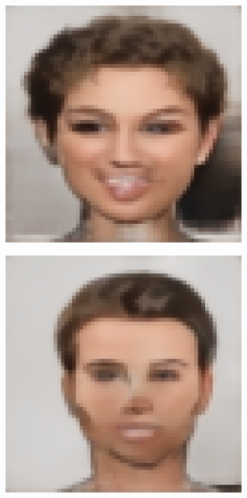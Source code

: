 \documentclass{IEEEcsmag}
\begin{document}
\begin{figure}[ht]
    \smallskip
    \setcounter{subfigure}{0}  %
    
    \begin{subfigure}{0.12\textwidth}
        \includegraphics[width=\linewidth]{Prompted/generated_images/image4.webp_AE_UNET.png}
    \end{subfigure}
    \begin{subfigure}{0.12\textwidth}
        \includegraphics[width=\linewidth]{Digital sketches/generated_images/image16.jpeg_AE_UNET.png}

\end{subfigure}
\end{figure}
\end{document}
